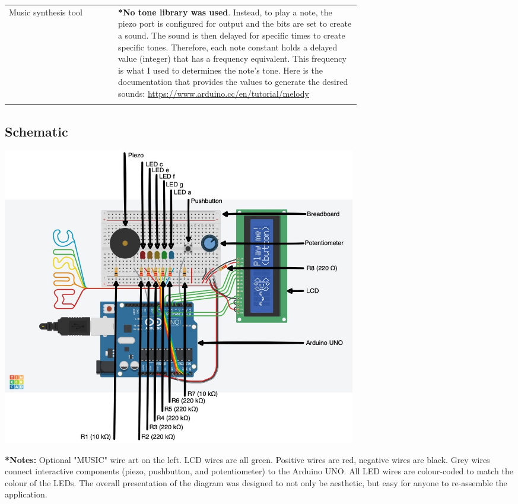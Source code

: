 \documentclass[a4paper]{article}
\begin{document}
\begin{center}
\begin{tabular}{ l | p{0.69\linewidth} }
 Music synthesis tool & \textbf{*No tone library was used}. Instead, to play a note, the piezo port is configured for output and the bits are set to create a sound. The sound is then delayed for specific times to create specific tones. Therefore, each note constant holds a delayed value (integer) that has a frequency equivalent. This frequency is what I used to determines the note’s tone. Here is the documentation that provides the values to generate the desired sounds: \url{https://www.arduino.cc/en/tutorial/melody}\\\\
 \hline
\end{tabular}
\end{center}

\newpage
\subsection{Schematic}
\begin{center}
\includegraphics[width=15.5cm]{schematic.jpg}
\end{center}

\par \textbf{*Notes:} Optional "MUSIC" wire art on the left. LCD wires are all green. Positive wires are red, negative wires are black. Grey wires connect interactive components (piezo, pushbutton, and potentiometer) to the Arduino UNO. All LED wires are colour-coded to match the colour of the LEDs. The overall presentation of the diagram was designed to not only be aesthetic, but easy for anyone to re-assemble the application.
\end{document}
